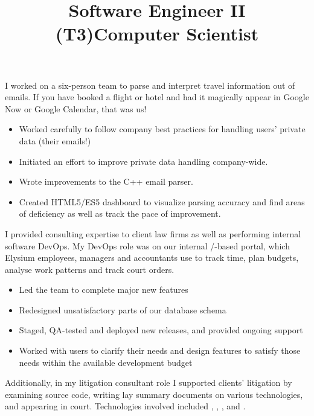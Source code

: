 \begin{resume}
\title{Software Engineer II (T3)}
\begin{position}
I worked on a six-person team to parse and interpret travel information out of
emails. If you have booked a flight or hotel and had it magically appear in
Google Now or Google Calendar, that was us!
\begin{itemize} 
  \item Worked carefully to follow company best practices for handling users' 
        private data (their emails!)
  \item Initiated an effort to improve private data handling company-wide.
  \item Wrote improvements to the C++ email parser.
  \item Created HTML5/ES5 dashboard to visualize parsing accuracy and find areas
        of deficiency as well as track the pace of improvement.
\end{itemize}

\end{position}


\title{Computer Scientist}
\begin{position}
I provided consulting expertise to client law firms as well as performing
internal software DevOps. My DevOps role was on our internal
/-based portal, which Elysium employees, managers and
accountants use to track
time, plan budgets, analyse work patterns and track court orders.

\begin{itemize}
\item Led the team to complete major new features
\item Redesigned unsatisfactory parts of our database schema
\item Staged, QA-tested and deployed new releases, and provided ongoing support
\item Worked with users to clarify their needs and design features to satisfy
those needs within the available development budget
\end{itemize}

Additionally, in my litigation consultant role I supported clients' litigation
by examining source code, writing lay summary documents on various
technologies, and appearing in court. Technologies involved included
, , ,  and
.
\end{position}


\end{resume}
